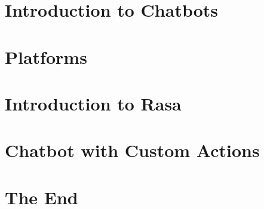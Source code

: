 \section[Intro]{Introduction to Chatbots}


\section[Platforms]{Platforms}


\section[Rasa]{Introduction to Rasa}



% 
% 


% 
% 

\section[Custom]{Chatbot with Custom Actions}


% 

% 

\section[End]{The End}

